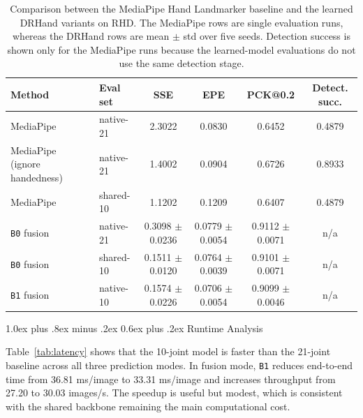 \documentclass[10pt,letterpaper]{article}
\makeatletter
\renewcommand\subsection{\@startsection{subsection}{2}{\z@}%
  {1.0ex plus .8ex minus .2ex}%
  {0.6ex plus .2ex}%
  {\normalfont\itshape}}
\makeatother
\begin{document}
\begin{table}[H]
\centering
\footnotesize
\caption{Comparison between the MediaPipe Hand Landmarker baseline and the learned DRHand variants on RHD. The MediaPipe rows are single evaluation runs, whereas the DRHand rows are mean $\pm$ std over five seeds. Detection success is shown only for the MediaPipe runs because the learned-model evaluations do not use the same detection stage.}
\label{tab:mediapipe_baseline}
\begin{tabular}{llcccc}
\toprule
Method & Eval set & SSE & EPE & PCK@0.2 & Detect. succ. \\
\midrule
MediaPipe & native-21 & 2.3022 & 0.0830 & 0.6452 & 0.4879 \\
MediaPipe (ignore handedness) & native-21 & 1.4002 & 0.0904 & 0.6726 & 0.8933 \\
MediaPipe & shared-10 & 1.1202 & 0.1209 & 0.6407 & 0.4879 \\
\texttt{B0} fusion & native-21 & 0.3098 $\pm$ 0.0236 & 0.0779 $\pm$ 0.0054 & 0.9112 $\pm$ 0.0071 & n/a \\
\texttt{B0} fusion & shared-10 & 0.1511 $\pm$ 0.0120 & 0.0764 $\pm$ 0.0039 & 0.9101 $\pm$ 0.0071 & n/a \\
\texttt{B1} fusion & native-10 & 0.1574 $\pm$ 0.0226 & 0.0706 $\pm$ 0.0054 & 0.9099 $\pm$ 0.0046 & n/a \\
\bottomrule
\end{tabular}
\end{table}

\subsection{Runtime Analysis}

Table~\ref{tab:latency} shows that the 10-joint model is faster than the 21-joint baseline across all three prediction modes. In fusion mode, \texttt{B1} reduces end-to-end time from 36.81 ms/image to 33.31 ms/image and increases throughput from 27.20 to 30.03 images/s. The speedup is useful but modest, which is consistent with the shared backbone remaining the main computational cost.
\end{document}
